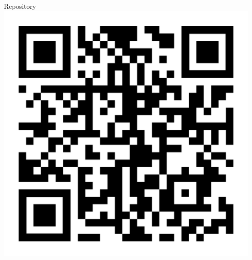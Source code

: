 \documentclass{beamer}
\begin{document}
\begin{frame}{Repository}
	\vspace*{5mm}
		\centering
	\includegraphics[width=.70\linewidth]{img/qr-code-asa.png}
\end{frame}
\end{document}
